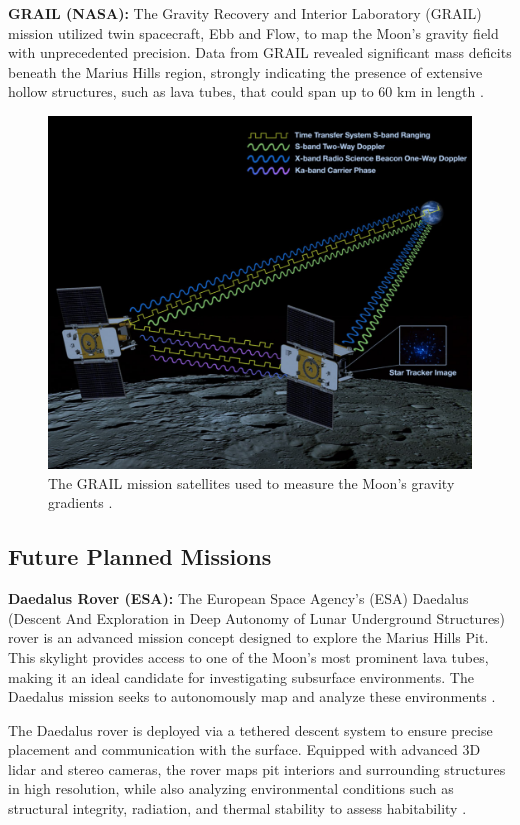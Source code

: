 \textbf{GRAIL (NASA):}  
The Gravity Recovery and Interior Laboratory (GRAIL) mission utilized twin spacecraft, Ebb and Flow, to map the Moon's gravity field with unprecedented precision. Data from GRAIL revealed significant mass deficits beneath the Marius Hills region, strongly indicating the presence of extensive hollow structures, such as lava tubes, that could span up to 60 km in length \cite{grails-gradients-mariushills}.

\begin{figure}[H]
    \centering
    \includegraphics[width=0.52\linewidth]{grail.png}
    \caption{The GRAIL mission satellites used to measure the Moon’s gravity gradients \cite{GRAIL}.}
    \label{fig:grail-render}
\end{figure}

\subsection{Future Planned Missions}

\textbf{Daedalus Rover (ESA):}  
The European Space Agency’s (ESA) Daedalus (Descent And Exploration in Deep Autonomy of Lunar Underground Structures) rover is an advanced mission concept designed to explore the Marius Hills Pit. This skylight provides access to one of the Moon's most prominent lava tubes, making it an ideal candidate for investigating subsurface environments. The Daedalus mission seeks to autonomously map and analyze these environments \cite{esa-daedalus}.

The Daedalus rover is deployed via a tethered descent system to ensure precise placement and communication with the surface. Equipped with advanced 3D lidar and stereo cameras, the rover maps pit interiors and surrounding structures in high resolution, while also analyzing environmental conditions such as structural integrity, radiation, and thermal stability to assess habitability \cite{esa-daedalus}.

